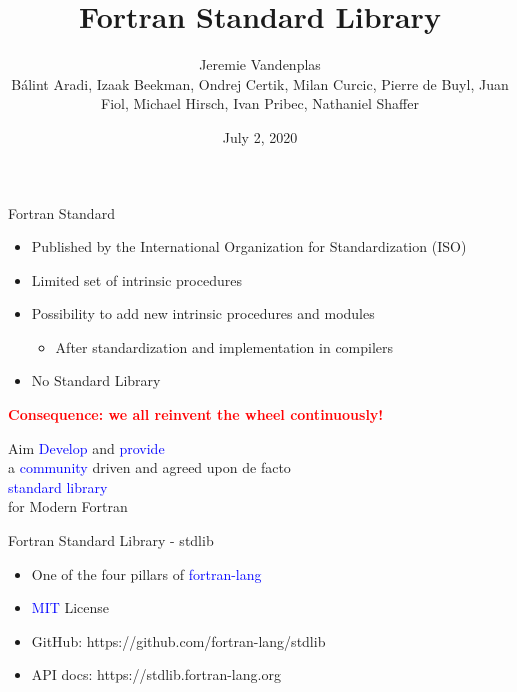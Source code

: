 \documentclass{beamer}
\title{Fortran Standard Library}
\author[]{Jeremie Vandenplas\\[3mm]
Bálint Aradi,
Izaak Beekman,
Ondrej Certik,
Milan Curcic,
Pierre de Buyl,
Juan Fiol,
Michael Hirsch,
Ivan Pribec,
Nathaniel Shaffer}
\date{July 2, 2020}
\begin{document}
\begin{frame}[t]
	\titlepage
\end{frame}	

\begin{frame}[c]{Fortran Standard}
	\begin{itemize}
		\item Published by the International Organization for Standardization (ISO)
		\item Limited set of intrinsic procedures
		\item Possibility to add new intrinsic procedures and modules
		\begin{itemize}
			\item After standardization and implementation in compilers
		\end{itemize}
		\item No Standard Library
	\end{itemize}
	\center
	\textcolor{red}{\textbf{Consequence: we all reinvent the wheel continuously!}}
\end{frame}


\begin{frame}[c]{Aim}
	\center
	\Large
	\textcolor{blue}{Develop} and \textcolor{blue}{provide}\\
	a \textcolor{blue}{community} driven and agreed upon de facto\\
	\textcolor{blue}{standard library}\\
	for Modern Fortran
\end{frame}


\begin{frame}[c]{Fortran Standard Library - stdlib}
	\Large
	\begin{itemize}
		\item One of the four pillars of \textcolor{blue}{fortran-lang}
		\item \textcolor{blue}{MIT} License
		\item GitHub: https://github.com/fortran-lang/stdlib
		\item API docs: https://stdlib.fortran-lang.org
	\end{itemize}
\end{frame}
\end{document}
